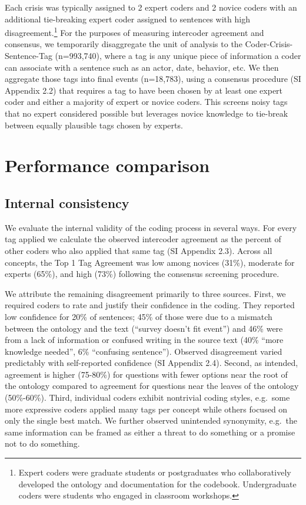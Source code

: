 \documentclass{article}
\begin{document}
Each crisis was typically assigned to 2 expert coders and 2 novice
coders with an additional tie-breaking expert coder assigned to
sentences with high disagreement.\footnote{Expert coders were graduate
  students or postgraduates who collaboratively developed the ontology
  and documentation for the codebook. Undergraduate coders were students
  who engaged in classroom workshops.} For the purposes of measuring
intercoder agreement and consensus, we temporarily disaggregate the unit
of analysis to the Coder-Crisis-Sentence-Tag (n=993,740), where a tag is
any unique piece of information a coder can associate with a sentence
such as an actor, date, behavior, etc. We then aggregate those tags into
final events (n=18,783), using a consensus procedure (SI Appendix 2.2)
that requires a tag to have been chosen by at least one expert coder and
either a majority of expert or novice coders. This screens noisy tags
that no expert considered possible but leverages novice knowledge to
tie-break between equally plausible tags chosen by experts.

\hypertarget{performance-comparison}{%
\section{Performance comparison}\label{performance-comparison}}

\hypertarget{internal-consistency}{%
\subsection{Internal consistency}\label{internal-consistency}}

We evaluate the internal validity of the coding process in several ways.
For every tag applied we calculate the observed intercoder agreement as
the percent of other coders who also applied that same tag (SI Appendix
2.3). Across all concepts, the Top 1 Tag Agreement was low among novices
(31\%), moderate for experts (65\%), and high (73\%) following the
consensus screening procedure.

We attribute the remaining disagreement primarily to three sources.
First, we required coders to rate and justify their confidence in the
coding. They reported low confidence for 20\% of sentences; 45\% of
those were due to a mismatch between the ontology and the text (``survey
doesn't fit event'') and 46\% were from a lack of information or
confused writing in the source text (40\% ``more knowledge needed'', 6\%
``confusing sentence''). Observed disagreement varied predictably with
self-reported confidence (SI Appendix 2.4). Second, as intended,
agreement is higher (75-80\%) for questions with fewer options near the
root of the ontology compared to agreement for questions near the leaves
of the ontology (50\%-60\%). Third, individual coders exhibit nontrivial
coding styles, e.g.~some more expressive coders applied many tags per
concept while others focused on only the single best match. We further
observed unintended synonymity, e.g.~the same information can be framed
as either a threat to do something or a promise not to do something.
\end{document}

